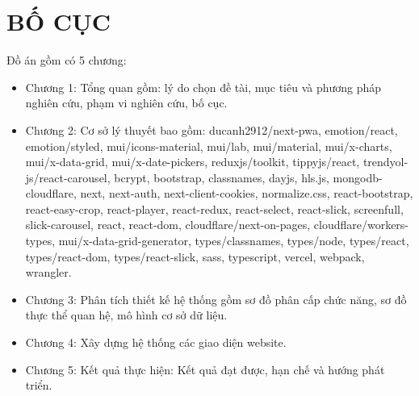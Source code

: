\section{BỐ CỤC}
Đồ án gồm có 5 chương:
\begin{itemize}
    \item Chương 1: Tổng quan gồm: lý do chọn đề tài, mục tiêu và phương pháp nghiên cứu, phạm vi nghiên cứu, bố cục.
    \item Chương 2: Cơ sở lý thuyết bao gồm:
        ducanh2912/next-pwa,
        emotion/react,
        emotion/styled,
        mui/icons-material,
        mui/lab,
        mui/material,
        mui/x-charts,
        mui/x-data-grid,
        mui/x-date-pickers,
        reduxjs/toolkit,
        tippyjs/react,
        trendyol-js/react-carousel,
        bcrypt,
        bootstrap,
        classnames,
        dayjs,
        hls.js,
        mongodb-cloudflare,
        next,
        next-auth,
        next-client-cookies,
        normalize.css,
        react-bootstrap,
        react-easy-crop,
        react-player,
        react-redux,
        react-select,
        react-slick,
        screenfull,
        slick-carousel,
        react,
        react-dom,
        cloudflare/next-on-pages,
        cloudflare/workers-types,
        mui/x-data-grid-generator,
        types/classnames,
        types/node,
        types/react,
        types/react-dom,
        types/react-slick,
        sass,
        typescript,
        vercel,
        webpack,
        wrangler.
    
    \item Chương 3: Phân tích thiết kế hệ thống gồm sơ đồ phân cấp chức năng, sơ đồ thực thể quan hệ, mô hình cơ sở dữ liệu.
    \item Chương 4: Xây dựng hệ thống các giao diện website.
    \item Chương 5: Kết quả thực hiện: Kết quả đạt được, hạn chế và hướng phát triển.
\end{itemize}
